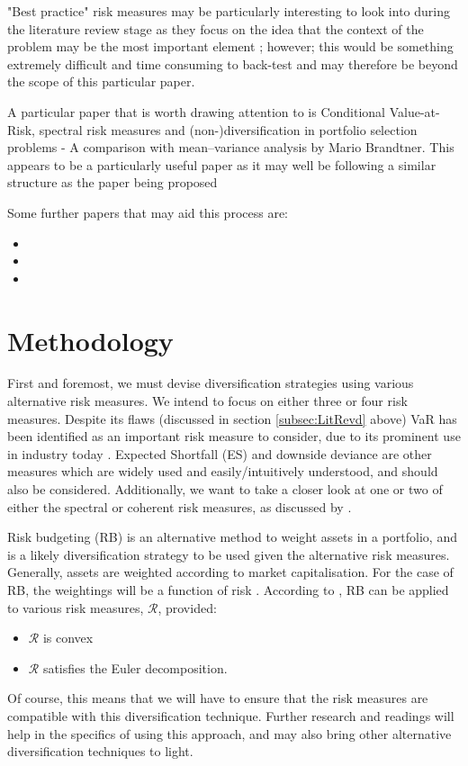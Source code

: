 \documentclass[12pt,a4paper]{article}
\newcommand{\bi}{\begin{itemize}}
\newcommand{\ei}{\end{itemize}}
\begin{document}
 "Best practice" risk measures may be particularly interesting to look into during the literature review stage as they focus on the idea that the context of the problem may be the most important element \citep{dowd2006after}; however; this would be something extremely difficult and time consuming to back-test and may therefore be beyond the scope of this particular paper.

A particular paper that is worth drawing attention to is Conditional Value-at-Risk, spectral risk measures and
(non-)diversification in portfolio selection problems - A comparison with mean–variance analysis by Mario Brandtner. This appears to be a particularly useful paper as it may well be following a similar structure as the paper being proposed

Some further papers that may aid this process are: 
\bi
\item 
\item 
\item
\ei

\section{Methodology}
\label{sec:Method}

First and foremost, we must devise diversification strategies using various alternative risk measures. We intend to focus on either three or four risk measures. Despite its flaws (discussed in section \ref{subsec:LitRevd} above) VaR has been identified as an important risk measure to consider, due to its prominent use in industry today \citep{consiglirisk}. Expected Shortfall (ES) and downside deviance are other measures which are widely used and easily/intuitively understood, and should also be considered. Additionally, we want to take a closer look at one or two of either the spectral or coherent risk measures, as discussed by \cite{dowd2006after}.

Risk budgeting (RB) is an alternative method to weight assets in a portfolio, and is a likely diversification strategy to be used given the alternative risk measures. Generally, assets are weighted according to market capitalisation. For the case of RB, the weightings will be a function of risk \citep{bruder2012managing}. According to \cite{bruder2012managing}, RB can be applied to various risk measures, $\mathcal{R}$, provided:
\bi
\item $\mathcal{R}$ is convex
\item $\mathcal{R}$ satisfies the Euler decomposition.
\ei 
Of course, this means that we will have to ensure that the risk measures are compatible with this diversification technique. Further research and readings will help in the specifics of using this approach, and may also bring other alternative diversification techniques to light.
\end{document}
